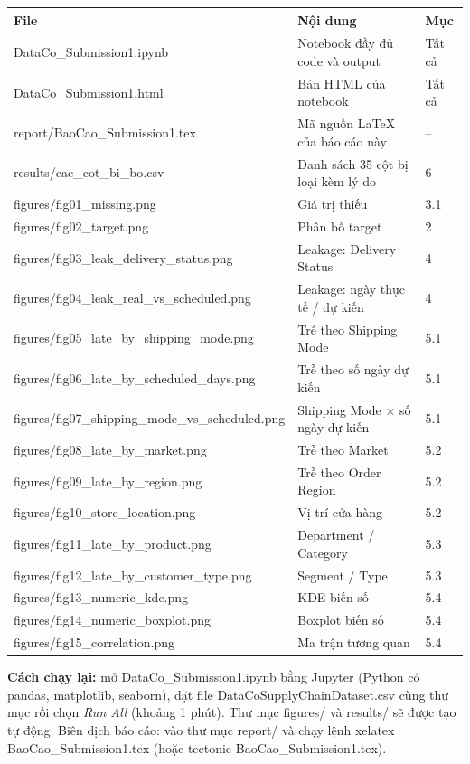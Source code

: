\documentclass[11pt,a4paper]{article}
\newcommand{\col}[1]{\textsf{#1}}
\begin{document}
\small
\begin{longtable}{@{}p{7.6cm}p{5.6cm}l@{}}
\toprule
\textbf{File} & \textbf{Nội dung} & \textbf{Mục} \\ \midrule
\endhead
\col{DataCo\_Submission1.ipynb} & Notebook đầy đủ code và output & Tất cả \\
\col{DataCo\_Submission1.html} & Bản HTML của notebook & Tất cả \\
\col{report/BaoCao\_Submission1.tex} & Mã nguồn LaTeX của báo cáo này & -- \\
\col{results/cac\_cot\_bi\_bo.csv} & Danh sách 35 cột bị loại kèm lý do & 6 \\
\col{figures/fig01\_missing.png} & Giá trị thiếu & 3.1 \\
\col{figures/fig02\_target.png} & Phân bố target & 2 \\
\col{figures/fig03\_leak\_delivery\_status.png} & Leakage: Delivery Status & 4 \\
\col{figures/fig04\_leak\_real\_vs\_scheduled.png} & Leakage: ngày thực tế / dự kiến & 4 \\
\col{figures/fig05\_late\_by\_shipping\_mode.png} & Trễ theo Shipping Mode & 5.1 \\
\col{figures/fig06\_late\_by\_scheduled\_days.png} & Trễ theo số ngày dự kiến & 5.1 \\
\col{figures/fig07\_shipping\_mode\_vs\_scheduled.png} & Shipping Mode $\times$ số ngày dự kiến & 5.1 \\
\col{figures/fig08\_late\_by\_market.png} & Trễ theo Market & 5.2 \\
\col{figures/fig09\_late\_by\_region.png} & Trễ theo Order Region & 5.2 \\
\col{figures/fig10\_store\_location.png} & Vị trí cửa hàng & 5.2 \\
\col{figures/fig11\_late\_by\_product.png} & Department / Category & 5.3 \\
\col{figures/fig12\_late\_by\_customer\_type.png} & Segment / Type & 5.3 \\
\col{figures/fig13\_numeric\_kde.png} & KDE biến số & 5.4 \\
\col{figures/fig14\_numeric\_boxplot.png} & Boxplot biến số & 5.4 \\
\col{figures/fig15\_correlation.png} & Ma trận tương quan & 5.4 \\
\bottomrule
\end{longtable}
\normalsize

{\sloppy\textbf{Cách chạy lại:} mở \col{DataCo\_Submission1.ipynb} bằng Jupyter (Python có pandas, matplotlib, seaborn),
đặt file \col{DataCoSupplyChainDataset.csv} cùng thư mục rồi chọn \textit{Run All} (khoảng 1 phút). Thư mục
\col{figures/} và \col{results/} sẽ được tạo tự động. Biên dịch báo cáo: vào thư mục \col{report/} và chạy
lệnh \col{xelatex BaoCao\_Submission1.tex} (hoặc \col{tectonic BaoCao\_Submission1.tex}).\par}
\end{document}
